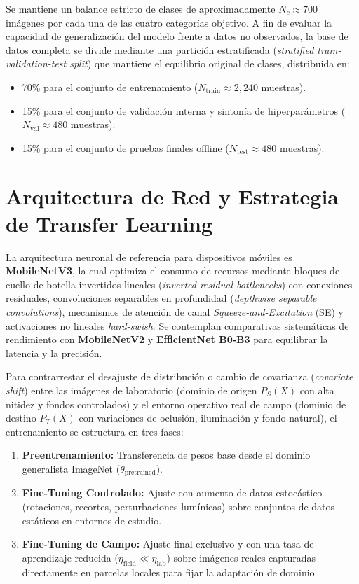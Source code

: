 \documentclass[10pt,journal,compsoc]{IEEEtran} %
\begin{document}
Se mantiene un balance estricto de clases de aproximadamente $N_c \approx 700$ imágenes por cada una de las cuatro categorías objetivo. A fin de evaluar la capacidad de generalización del modelo frente a datos no observados, la base de datos completa se divide mediante una partición estratificada (\textit{stratified train-validation-test split}) que mantiene el equilibrio original de clases, distribuida en:
\begin{itemize}
    \item 70\% para el conjunto de entrenamiento ($N_{\text{train}} \approx 2,240$ muestras).
    \item 15\% para el conjunto de validación interna y sintonía de hiperparámetros ($N_{\text{val}} \approx 480$ muestras).
    \item 15\% para el conjunto de pruebas finales offline ($N_{\text{test}} \approx 480$ muestras).
\end{itemize}

\section{Arquitectura de Red y Estrategia de Transfer Learning}
La arquitectura neuronal de referencia para dispositivos móviles es \textbf{MobileNetV3}, la cual optimiza el consumo de recursos mediante bloques de cuello de botella invertidos lineales (\textit{inverted residual bottlenecks}) con conexiones residuales, convoluciones separables en profundidad (\textit{depthwise separable convolutions}), mecanismos de atención de canal \textit{Squeeze-and-Excitation} (SE) y activaciones no lineales \textit{hard-swish}. Se contemplan comparativas sistemáticas de rendimiento con \textbf{MobileNetV2} y \textbf{EfficientNet B0-B3} para equilibrar la latencia y la precisión.

Para contrarrestar el desajuste de distribución o cambio de covarianza (\textit{covariate shift}) entre las imágenes de laboratorio (dominio de origen $P_S(X)$ con alta nitidez y fondos controlados) y el entorno operativo real de campo (dominio de destino $P_T(X)$ con variaciones de oclusión, iluminación y fondo natural), el entrenamiento se estructura en tres fases:
\begin{enumerate}
    \item \textbf{Preentrenamiento:} Transferencia de pesos base desde el dominio generalista ImageNet ($ \theta_{\text{pretrained}} $).
    \item \textbf{Fine-Tuning Controlado:} Ajuste con aumento de datos estocástico (rotaciones, recortes, perturbaciones lumínicas) sobre conjuntos de datos estáticos en entornos de estudio.
    \item \textbf{Fine-Tuning de Campo:} Ajuste final exclusivo y con una tasa de aprendizaje reducida ($\eta_{\text{field}} \ll \eta_{\text{lab}}$) sobre imágenes reales capturadas directamente en parcelas locales para fijar la adaptación de dominio.
\end{enumerate}
\end{document}
